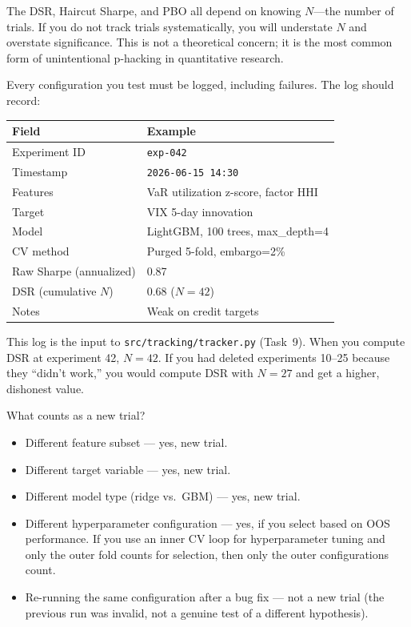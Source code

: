 The DSR, Haircut Sharpe, and PBO all depend on knowing $N$---the number of trials. If you do not track trials systematically, you will understate $N$ and overstate significance. This is not a theoretical concern; it is the most common form of unintentional p-hacking in quantitative research.

\begin{keyidea}
Every configuration you test must be logged, including failures. The log should record:
\begin{center}
\begin{tabular}{ll}
\toprule
\textbf{Field} & \textbf{Example} \\
\midrule
Experiment ID & \texttt{exp-042} \\
Timestamp & \texttt{2026-06-15 14:30} \\
Features & VaR utilization z-score, factor HHI \\
Target & VIX 5-day innovation \\
Model & LightGBM, 100 trees, max\_depth=4 \\
CV method & Purged 5-fold, embargo=2\% \\
Raw Sharpe (annualized) & 0.87 \\
DSR (cumulative $N$) & 0.68 ($N = 42$) \\
Notes & Weak on credit targets \\
\bottomrule
\end{tabular}
\end{center}
This log is the input to \texttt{src/tracking/tracker.py} (Task~9). When you compute DSR at experiment 42, $N = 42$. If you had deleted experiments 10--25 because they ``didn't work,'' you would compute DSR with $N = 27$ and get a higher, dishonest value.
\end{keyidea}

What counts as a new trial?

\begin{itemize}[nosep]
  \item Different feature subset --- yes, new trial.
  \item Different target variable --- yes, new trial.
  \item Different model type (ridge vs.\ GBM) --- yes, new trial.
  \item Different hyperparameter configuration --- yes, if you select based on OOS performance. If you use an inner CV loop for hyperparameter tuning and only the outer fold counts for selection, then only the outer configurations count.
  \item Re-running the same configuration after a bug fix --- not a new trial (the previous run was invalid, not a genuine test of a different hypothesis).
\end{itemize}

